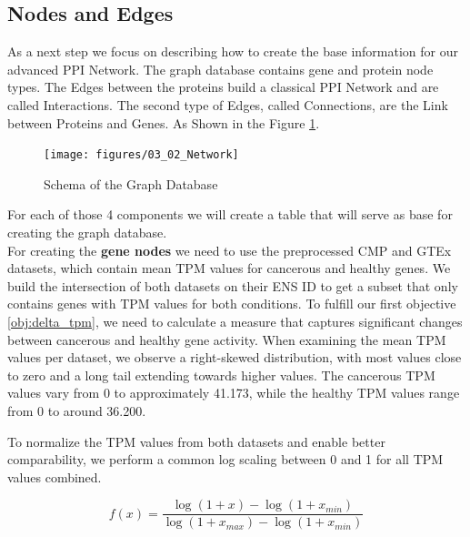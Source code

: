 \subsection{Nodes and Edges} \label{subsec:nodes_and_edges}

As a next step we focus on describing how to create the base information for our advanced PPI Network.
The graph database contains gene and protein node types.
The Edges between the proteins build a classical PPI Network and are called Interactions. %
The second type of Edges, called Connections, are the Link between Proteins and Genes.
As Shown in the Figure \ref{fig:03_02_Network}.

\begin{figure}[h]
\centering
\texttt{[image: figures/03\_02\_Network]}
\caption{Schema of the Graph Database}
\label{fig:03_02_Network}
\end{figure}

For each of those 4 components we will create a table that will serve as base for creating the graph database.\\


For creating the \textbf{gene nodes} we need to use the preprocessed CMP and GTEx datasets,
which contain mean TPM values for cancerous and healthy genes.
We build the intersection of both datasets on their ENS ID to get a subset that only contains genes with TPM values for both conditions.
To fulfill our first objective \ref{obj:delta_tpm},
we need to calculate a measure that captures significant changes between cancerous and healthy gene activity.
When examining the mean TPM values per dataset, we observe a right-skewed distribution, with most values close to zero
and a long tail extending towards higher values.
The cancerous TPM values vary from 0 to approximately 41.173, while the healthy TPM values range from 0 to around 36.200.



To normalize the TPM values from both datasets and enable better comparability, we perform a common log scaling between 0 and 1 for all TPM values combined.

\begin{equation}
\label{eq:tpm_normalization}
f(x) = \frac{\log(1 + x) - \log(1 + x_{min})}{\log(1 + x_{max}) - \log(1 + x_{min})}
\end{equation}

